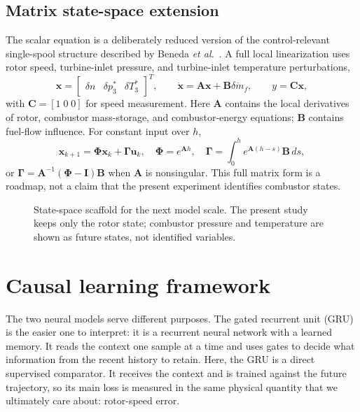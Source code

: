 \documentclass[10pt,journal]{IEEEtran}
\begin{document}
\subsection{Matrix state-space extension}
The scalar equation is a deliberately reduced version of the control-relevant single-spool structure described by Beneda \emph{et al.}~\cite{beneda2018spool}. A full local linearization uses rotor speed, turbine-inlet pressure, and turbine-inlet temperature perturbations,
\begin{equation}
 \mathbf{x}=\begin{bmatrix}\delta n&\delta p_3^*&\delta T_3^*\end{bmatrix}^{\!T},\qquad
 \dot{\mathbf{x}}=\mathbf{A}\mathbf{x}+\mathbf{B}\delta\dot m_f,\qquad y=\mathbf{C}\mathbf{x},
 \label{eq:ss}
\end{equation}
with $\mathbf{C}=[1\;0\;0]$ for speed measurement. Here $\mathbf{A}$ contains the local derivatives of rotor, combustor mass-storage, and combustor-energy equations; $\mathbf{B}$ contains fuel-flow influence. For constant input over $h$,
\begin{equation}
 \mathbf{x}_{k+1}=\boldsymbol{\Phi}\mathbf{x}_k+\boldsymbol{\Gamma}\mathbf{u}_k,\quad
 \boldsymbol{\Phi}=e^{\mathbf{A}h},\quad
 \boldsymbol{\Gamma}=\int_0^h e^{\mathbf{A}(h-s)}\mathbf{B}\,ds,
 \label{eq:matrix_exact}
\end{equation}
or $\boldsymbol{\Gamma}=\mathbf{A}^{-1}(\boldsymbol{\Phi}-\mathbf{I})\mathbf{B}$ when $\mathbf{A}$ is nonsingular. This full matrix form is a roadmap, not a claim that the present experiment identifies combustor states.

\begin{figure}[!t]
 \centering
 \resizebox{0.96\textwidth}{!}{}
 \caption{State-space scaffold for the next model scale. The present study keeps only the rotor state; combustor pressure and temperature are shown as future states, not identified variables.}
 \label{fig:matrix}
\end{figure}

\section{Causal learning framework}
The two neural models serve different purposes. The gated recurrent unit (GRU) is the easier one to interpret: it is a recurrent neural network with a learned memory. It reads the context one sample at a time and uses gates to decide what information from the recent history to retain. Here, the GRU is a direct supervised comparator. It receives the context and is trained against the future trajectory, so its main loss is measured in the same physical quantity that we ultimately care about: rotor-speed error.
\end{document}
